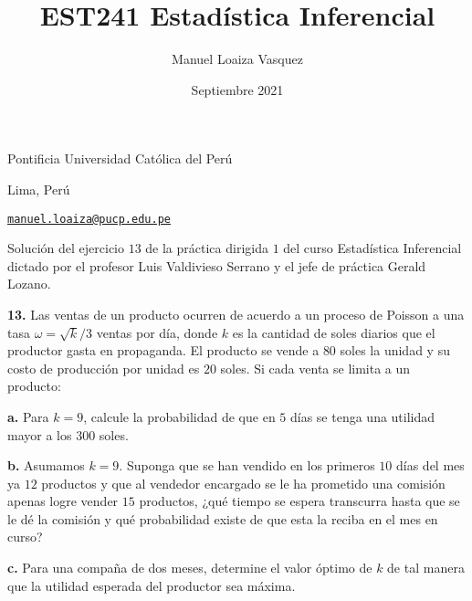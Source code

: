 \documentclass{article}
\title{EST241 Estad\'istica Inferencial}
\author{Manuel Loaiza Vasquez}
\date{Septiembre 2021}
\newenvironment{statement}[1]{\smallskip\noindent\color[rgb]{1.00,0.00,0.50} {\bf #1.}}{}
\theoremstyle{definition}
\theoremstyle{remark}
\begin{document}
\maketitle

\vspace*{-0.25in}
\centerline{Pontificia Universidad Cat\'olica del Per\'u}
\centerline{Lima, Per\'u}
\centerline{\href{mailto:manuel.loaiza@pucp.edu.pe}{{\tt manuel.loaiza@pucp.edu.pe}}}
\vspace*{0.15in}

\begin{framed}
  Soluci\'on del ejercicio $13$ de la pr\'actica dirigida $1$ del curso
  Estad\'istica Inferencial dictado por el profesor Luis Valdivieso Serrano
  y el jefe de pr\'actica Gerald Lozano.
\end{framed}

\begin{statement}{13}
  Las ventas de un producto ocurren de acuerdo a un proceso de Poisson a una
  tasa $\omega = \sqrt{k} / 3$ ventas por d\'ia, donde $k$ es la cantidad de
  soles diarios que el productor gasta en propaganda.
  El producto se vende a $80$ soles la unidad y su costo de producci\'on por
  unidad es $20$ soles. Si cada venta se limita a un producto:
\end{statement}

\begin{statement}{a}
  Para $k = 9$, calcule la probabilidad de que en $5$ d\'ias se tenga una
  utilidad mayor a los $300$ soles.
\end{statement}

\begin{statement}{b}
  Asumamos $k = 9$.
  Suponga que se han vendido en los primeros $10$ d\'ias del mes ya $12$
  productos y que al vendedor encargado se le ha prometido una comisi\'on apenas
  logre vender $15$ productos, ¿qu\'e tiempo se espera transcurra hasta que
  se le d\'e la comisi\'on y qu\'e probabilidad existe de que esta la reciba
  en el mes en curso?
\end{statement}

\begin{statement}{c}
  Para una compa\~na de dos meses, determine el valor \'optimo de $k$ de tal
  manera que la utilidad esperada del productor sea m\'axima.
\end{statement}
\end{document}
